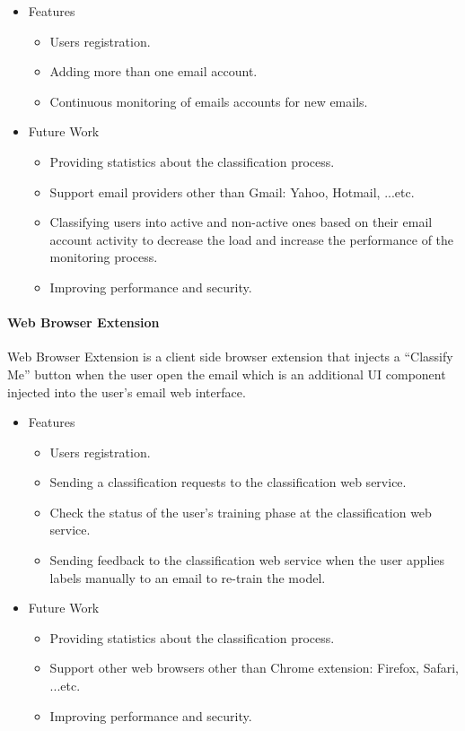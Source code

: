 \begin{itemize}
 \item Features
 \begin{itemize}
    \item Users registration.
    \item Adding more than one email account.
    \item Continuous monitoring of emails accounts for new emails.
 \end{itemize}
 \item Future Work
  \begin{itemize}
    \item Providing statistics about the classification process.
    \item Support email providers other than Gmail: Yahoo, Hotmail, ...etc.
    \item Classifying users into active and non-active ones based on their 
    email account activity to decrease the load and increase the performance 
    of the monitoring process.
    \item Improving performance and security.
  \end{itemize}
\end{itemize}

\paragraph{Web Browser Extension}
Web Browser Extension is a client side browser extension that injects a 
``Classify Me'' button when the user open the email which is an additional 
UI component injected into the user's email web interface. 


\begin{itemize}
 \item Features
 \begin{itemize}
    \item Users registration.
    \item Sending a classification requests to the classification web service.
    \item Check the status of the user's training phase at the classification 
    web service.
    \item Sending feedback to the classification web service when the user
    applies labels manually to an email to re-train the model.
 \end{itemize}
 \item Future Work
  \begin{itemize}
    \item Providing statistics about the classification process.
    \item Support other web browsers other than Chrome extension: Firefox, 
    Safari, ...etc.
    \item Improving performance and security.
  \end{itemize}
\end{itemize}

